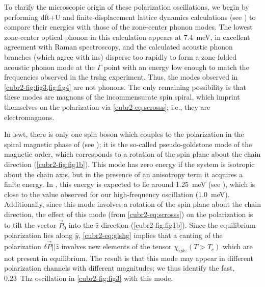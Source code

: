 To clarify the microscopic origin of these polarization oscillations, we begin by performing \gls{dft}+U and finite-displacement lattice dynamics calculations\cite{} (see ) to compare their energies with those of the zone-center phonon modes.
The lowest zone-center optical phonon in this calculation appears at \qty{7.4}{meV}, in excellent agreement with Raman spectroscopy\cite{wang_observation_2017}, and the calculated acoustic phonon branches (which agree with \gls{ins}\cite{wang_observation_2017}) disperse too rapidly to form a zone-folded acoustic phonon mode at the $\Gamma$ point with an energy low enough to match the frequencies observed in the \gls{trshg} experiment.
Thus, the modes observed in \cref{cubr2-fig:fig3,fig:fig4} are not phonons.
The only remaining possibility is that these modes are magnons of the incommensurate spin spiral, which imprint themselves on the polarization via \cref{cubr2-eq:scrosss}; i.e., they are electromagnons.

In \gls{lswt}, there is only one spin boson which couples to the polarization in the spiral magnetic phase of  (see ); it is the so-called pseudo-goldstone mode of the magnetic order\cite{katsura_dynamical_2007}, which corresponds to a rotation of the spin plane about the chain direction (\cref{cubr2-fig:fig1b}).
This mode has zero energy if the system is isotropic about the chain axis, but in the presence of an anisotropy term it acquires a finite energy.
In , this energy is expected to lie around \qty{1.25}{meV} (see ), which is close to the value observed for our high-frequency oscillation (\qty{1.0}{meV}).
Additionally, since this mode involves a rotation of the spin plane about the chain direction, the effect of this mode (from \cref{cubr2-eq:scrosss}) on the polarization is to tilt the vector $\vec{P}_0$ into the $\hat{z}$ direction (\cref{cubr2-fig:fig1b}).
Since the equilibrium polarization lies along $\hat{y}$, \cref{cubr2-eq:glshg} implies that a canting of the polarization $\delta \vec{P} || \hat{z}$ involves new elements of the tensor $\chi_{ijkz}(T>T_c)$ which are not present in equilibrium.
The result is that this mode may appear in different polarization channels with different magnitudes; we thus identify the fast, \qty{0.23}{Thz} oscillation in \cref{cubr2-fig:fig3} with this mode.


